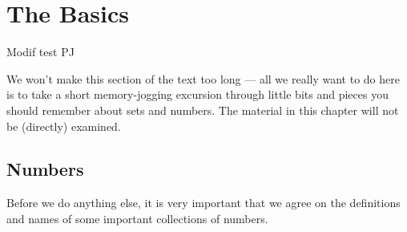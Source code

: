 %
%
\graphicspath{{./figures/basic/}}

\chapter{The Basics}
\label{chap basics}
Modif test PJ


We won't make this section of the text too long --- all we really want to do
here is to take a short memory-jogging excursion through little bits and
pieces you should remember about sets and numbers. The material in this chapter will not
be (directly) examined.


\section{Numbers}\label{sec_0_1}
Before we do anything else, it is very important that we agree on the definitions
and names of some important collections of numbers.

